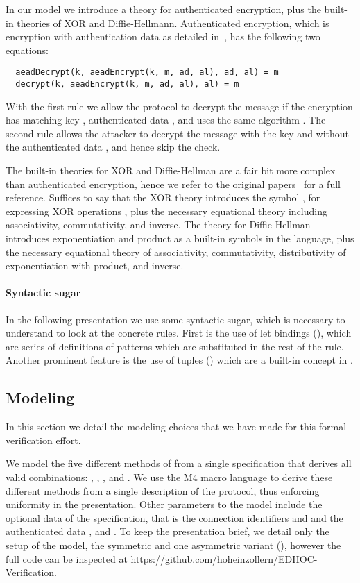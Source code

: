 In our model we introduce a theory for authenticated encryption, plus the
built-in theories of XOR and Diffie-Hellmann.
%
Authenticated encryption, which is encryption with authentication data as
detailed in~\cite{aead}, has the following two equations:
\begin{lstlisting}
  aeadDecrypt(k, aeadEncrypt(k, m, ad, al), ad, al) = m
  decrypt(k, aeadEncrypt(k, m, ad, al), al) = m
\end{lstlisting}
With the first rule we allow the protocol to decrypt the message  if the
encryption has matching key , authenticated data , and uses the
same algorithm .
%
The second rule allows the attacker to decrypt the message  with the key
 and without the authenticated data , and hence skip the check.

The built-in theories for XOR and Diffie-Hellman are a fair bit more complex
than authenticated encryption, hence we refer to the original
papers~\cite{xorTamarin,dhTamarin} for a full reference.
%
Suffices to say that the XOR theory introduces the symbol , for
expressing XOR operations , plus the necessary equational theory
including associativity, commutativity, and inverse.
%
The theory for Diffie-Hellman introduces exponentiation  and product
 as a built-in symbols in the language, plus the necessary equational
theory of associativity, commutativity, distributivity of exponentiation with
product, and inverse.

\paragraph{Syntactic sugar} In the following presentation we use some syntactic
sugar, which is necessary to understand to look at the concrete rules. First is
the use of let bindings (), which are series of
definitions of patterns which are substituted in the rest of the rule. Another
prominent feature is the use of tuples () which are a
built-in concept in \mTamarin.

\subsection{Modeling \mEdhoc{}}
In this section we detail the modeling choices that we have made for this formal
verification effort.

We model the five different methods of \mEdhoc{} from a single specification
that derives all valid combinations: \mPskPsk, \mSigSig, \mSigStat, \mStatSig
and \mStatStat.
%
We use the M4 macro language to derive these different methods from a single
description of the protocol, thus enforcing uniformity in the presentation.
%
Other parameters to the model include the optional data of the \mEdhoc{}
specification, that is the connection identifiers \mCi{} and \mCr{} and
the authenticated data \mADone, \mADtwo{} and \mADthree.
%
To keep the presentation brief, we detail only the setup of the model,
the symmetric and one asymmetric variant (\mSigStat), however the full
code can be inspected at
\url{https://github.com/hoheinzollern/EDHOC-Verification}.

